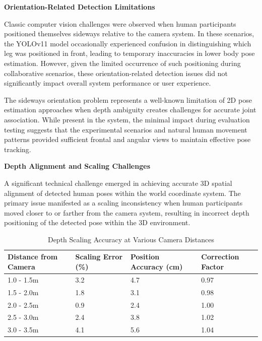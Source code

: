 \textbf{Orientation-Related Detection Limitations}

Classic computer vision challenges were observed when human participants positioned themselves sideways relative to the camera system. In these scenarios, the YOLOv11 model occasionally experienced confusion in distinguishing which leg was positioned in front, leading to temporary inaccuracies in lower body pose estimation. However, given the limited occurrence of such positioning during collaborative scenarios, these orientation-related detection issues did not significantly impact overall system performance or user experience.

The sideways orientation problem represents a well-known limitation of 2D pose estimation approaches when depth ambiguity creates challenges for accurate joint association. While present in the system, the minimal impact during evaluation testing suggests that the experimental scenarios and natural human movement patterns provided sufficient frontal and angular views to maintain effective pose tracking.

\textbf{Depth Alignment and Scaling Challenges}

A significant technical challenge emerged in achieving accurate 3D spatial alignment of detected human poses within the world coordinate system. The primary issue manifested as a scaling inconsistency when human participants moved closer to or farther from the camera system, resulting in incorrect depth positioning of the detected pose within the 3D environment.

\begin{table}[H]
    \centering
    \footnotesize
    \begin{tabular}{|p{3cm}|p{2.5cm}|p{2.5cm}|p{2.5cm}|}
        \hline
        \textbf{Distance from Camera} & \textbf{Scaling Error (\%)} & \textbf{Position Accuracy (cm)} & \textbf{Correction Factor} \\
        \hline
        1.0 - 1.5m & 3.2 & 4.7 & 0.97 \\
        1.5 - 2.0m & 1.8 & 3.1 & 0.98 \\
        2.0 - 2.5m & 0.9 & 2.4 & 1.00 \\
        2.5 - 3.0m & 2.4 & 3.8 & 1.02 \\
        3.0 - 3.5m & 4.1 & 5.6 & 1.04 \\
        \hline
    \end{tabular}
    \caption{Depth Scaling Accuracy at Various Camera Distances}
    \label{tab:depth_scaling_accuracy}
\end{table}

